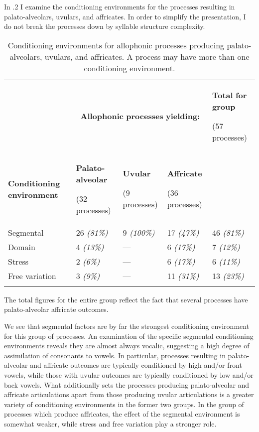   In .2 I examine the conditioning environments for the processes resulting in palato-alveolars, uvulars, and affricates. In order to simplify the presentation, I do not break the processes down by syllable structure complexity.






\begin{table}
\begin{tabularx}{\textwidth}{XXXXX}
\lsptoprule
 & \multicolumn{3}{c}{ \textbf{Allophonic} \textbf{processes} \textbf{yielding:}} & { \textbf{Total} \textbf{for} \textbf{group}}

 (57 processes)\\
 \textbf{Conditioning} \textbf{environment} & { \textbf{Palato-alveolar}}

 (32 processes) & { \textbf{Uvular}}

 (9 processes) & { \textbf{Affricate}}

 (36 processes) & \\
 Segmental & 26 \textit{(81\%)} & 9 \textit{(100\%)} & 17 \textit{(47\%)} & 46 \textit{(81\%)}\\
 Domain & 4 \textit{(13\%)} & — & 6 \textit{(17\%)} & 7 \textit{(12\%)}\\
 Stress & 2 \textit{(6\%)} & — & 6 \textit{(17\%)} & 6 \textit{(11\%)}\\
 Free variation & 3 \textit{(9\%)} & — & 11 \textit{(31\%)} & 13 \textit{(23\%)}\\
\lspbottomrule
\end{tabularx}
\caption{\label{7.2}Conditioning environments for allophonic processes producing palato-alveolars, uvulars, and affricates. A process may have more than one conditioning environment.}The total figures for the entire group reflect the fact that several processes have palato-alveolar affricate outcomes.
\end{table}




  We see that segmental factors are by far the strongest conditioning environment for this group of processes. An examination of the specific segmental conditioning environments reveals they are almost always vocalic, suggesting a high degree of assimilation of consonants to vowels.  In particular, processes resulting in palato-alveolar and affricate outcomes are typically conditioned by high and/or front vowels, while those with uvular outcomes are typically conditioned by low and/or back vowels. What additionally sets the processes producing palato-alveolar and affricate articulations apart from those producing uvular articulations is a greater variety of conditioning environments in the former two groups. In the group of processes which produce affricates, the effect of the segmental environment is somewhat weaker, while stress and free variation play a stronger role.


